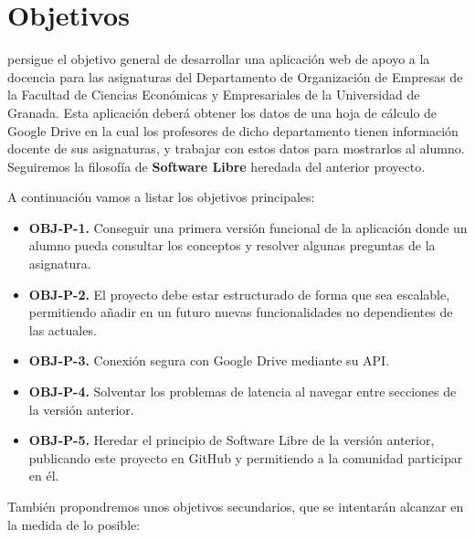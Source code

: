 \chapter{Objetivos}\label{sec:objetives}

{\titulo} persigue el objetivo general de desarrollar una aplicación web de apoyo a la docencia para las asignaturas del Departamento de Organización de Empresas de la Facultad de Ciencias Económicas y Empresariales de la Universidad de Granada. Esta aplicación deberá obtener los datos de una hoja de cálculo de Google Drive en la cual los profesores de dicho departamento tienen información docente de sus asignaturas, y trabajar con estos datos para mostrarlos al alumno. Seguiremos la filosofía de \textbf{Software Libre} heredada del anterior proyecto.


\bigskip
A continuación vamos a listar los objetivos principales:

\begin{itemize}
  \item \textbf{OBJ-P-1.} Conseguir una primera versión funcional de la aplicación donde un alumno pueda consultar los conceptos y resolver algunas preguntas de la asignatura.
  \item \textbf{OBJ-P-2.} El proyecto debe estar estructurado de forma que sea escalable, permitiendo añadir en un futuro nuevas funcionalidades no dependientes de las actuales.
  \item \textbf{OBJ-P-3.} Conexión segura con Google Drive mediante su API.
  \item \textbf{OBJ-P-4.} Solventar los problemas de latencia al navegar entre secciones de la versión anterior.
  \item \textbf{OBJ-P-5.} Heredar el principio de Software Libre de la versión anterior, publicando este proyecto en GitHub y permitiendo a la comunidad participar en él.
\end{itemize}


\bigskip
También propondremos unos objetivos secundarios, que se intentarán alcanzar en la medida de lo posible:

